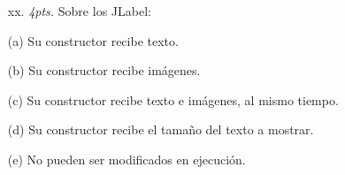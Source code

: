 \documentclass[10pt]{article}
\begin{document}
{\begin{enumerate}
\begin{multicols}{2}
    \begin{enumerate}[label=(\alph*)]
        \item[xx.] \emph{4pts.} Sobre los JLabel: 
        \item[(a)] Su constructor recibe texto.
        \item[(b)] Su constructor recibe im\'agenes.
        \item[(c)] Su constructor recibe texto e im\'agenes, al mismo tiempo.
        \item[(d)] Su constructor recibe el tama\~no del texto a mostrar.
        \item[(e)] No pueden ser modificados en ejecuci\'on.
    \end{enumerate}

\end{multicols}

\end{enumerate}
}
\end{document}
